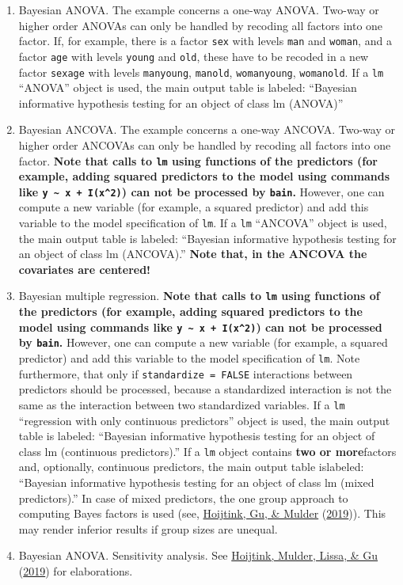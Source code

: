 \documentclass[
]{book}
\begin{document}
\begin{enumerate}
\def\labelenumi{\alph{enumi})}
\item
  Bayesian ANOVA. The example concerns a one-way ANOVA. Two-way or higher
  order ANOVAs can only be handled by recoding all factors into one
  factor. If, for example, there is a factor \texttt{sex} with levels \texttt{man} and \texttt{woman},
  and a factor \texttt{age} with levels \texttt{young} and \texttt{old}, these have to be recoded in a
  new factor \texttt{sexage} with levels \texttt{manyoung}, \texttt{manold}, \texttt{womanyoung}, \texttt{womanold}.
  If a \texttt{lm} ``ANOVA'' object is used, the main output table is
  labeled: ``Bayesian informative hypothesis testing for an object
  of class lm (ANOVA)''
\item
  Bayesian ANCOVA. The example concerns a one-way ANCOVA. Two-way or higher
  order ANCOVAs can only be handled by recoding all factors into one
  factor. \textbf{Note that calls to \texttt{lm} using functions of the predictors
  (for example, adding squared predictors to the model using commands like
  \texttt{y\ \textasciitilde{}\ x\ +\ I(x\^{}2)})
  can not be processed by \texttt{bain}.} However, one can compute a new variable
  (for example, a squared predictor) and add this variable to the
  model specification of \texttt{lm}. If a \texttt{lm} ``ANCOVA'' object is used, the
  main output table is
  labeled: ``Bayesian informative hypothesis testing for an object
  of class lm (ANCOVA).'' \textbf{Note that, in
  the ANCOVA the covariates are centered!}
\item
  Bayesian multiple regression. \textbf{Note that calls to \texttt{lm} using
  functions of the predictors (for example, adding squared predictors
  to the model using commands like \texttt{y\ \textasciitilde{}\ x\ +\ I(x\^{}2)})
  can not be processed by \texttt{bain}.} However, one can compute a new variable
  (for example, a squared predictor) and add this variable to the
  model specification of \texttt{lm}. Note furthermore, that only if
  \texttt{standardize\ =\ FALSE} interactions between predictors should
  be processed, because a standardized interaction is not the same as the
  interaction between two standardized variables.
  If a \texttt{lm} ``regression with only continuous predictors''
  object is used, the main output table is
  labeled: ``Bayesian informative hypothesis testing for an object
  of class lm (continuous predictors).'' If a \texttt{lm} object contains
  \textbf{two or more}factors and, optionally, continuous predictors, the main output table islabeled: ``Bayesian informative hypothesis testing for an object of
  class lm (mixed predictors).'' In case of mixed predictors, the one group
  approach to computing Bayes factors is used (see, \protect\hyperlink{ref-hoijtink2019bayesian}{Hoijtink, Gu, \& Mulder} (\protect\hyperlink{ref-hoijtink2019bayesian}{2019})). This may render inferior results if group sizes are unequal.
\item
  Bayesian ANOVA. Sensitivity analysis. See \protect\hyperlink{ref-hoijtink2019tutorial}{Hoijtink, Mulder, Lissa, \& Gu} (\protect\hyperlink{ref-hoijtink2019tutorial}{2019}) for elaborations.
\end{enumerate}
\end{document}
